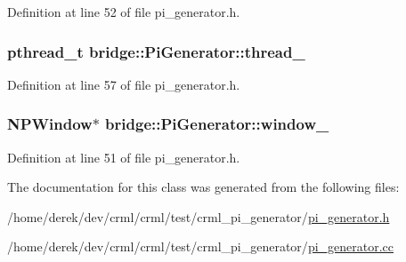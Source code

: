 Definition at line 52 of file pi\_\-generator.h.

\hypertarget{classbridge_1_1_pi_generator_ac31876104c79e459dd2d8fbe18a9932a}{
\subsubsection[{thread\_\-}]{\setlength{\rightskip}{0pt plus 5cm}pthread\_\-t {\bf bridge::PiGenerator::thread\_\-}}}
\label{classbridge_1_1_pi_generator_ac31876104c79e459dd2d8fbe18a9932a}


Definition at line 57 of file pi\_\-generator.h.

\hypertarget{classbridge_1_1_pi_generator_afd258b7e7f03a3b4f09e3f79138ffde2}{
\subsubsection[{window\_\-}]{\setlength{\rightskip}{0pt plus 5cm}NPWindow$\ast$ {\bf bridge::PiGenerator::window\_\-}}}
\label{classbridge_1_1_pi_generator_afd258b7e7f03a3b4f09e3f79138ffde2}


Definition at line 51 of file pi\_\-generator.h.



The documentation for this class was generated from the following files:\begin{DoxyCompactItemize}
\item 
/home/derek/dev/crml/crml/test/crml\_\-pi\_\-generator/\hyperlink{crml__pi__generator_2pi__generator_8h}{pi\_\-generator.h}\item 
/home/derek/dev/crml/crml/test/crml\_\-pi\_\-generator/\hyperlink{crml__pi__generator_2pi__generator_8cc}{pi\_\-generator.cc}\end{DoxyCompactItemize}
